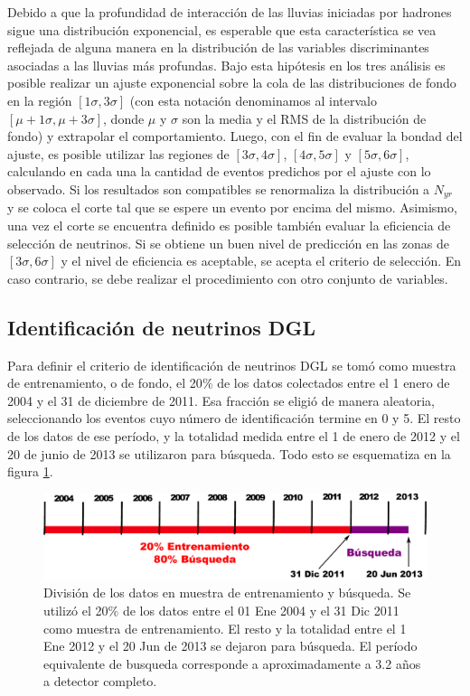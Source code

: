 	Debido a que la profundidad de interacción de las lluvias iniciadas por hadrones sigue una distribución exponencial, es esperable que esta característica se vea reflejada de alguna manera en la distribución de las variables discriminantes asociadas a las lluvias más profundas.
	Bajo esta hipótesis en los tres análisis es posible realizar un ajuste exponencial sobre la cola de las distribuciones de fondo en la región $[1\sigma, 3\sigma]$ (con esta notación denominamos al intervalo $[\mu+1\sigma, \mu+3\sigma]$, donde $\mu$ y $\sigma$ son la media y el RMS de la distribución de fondo) y extrapolar el comportamiento.
	Luego, con el fin de evaluar la bondad del ajuste, es posible utilizar las regiones de $[3\sigma, 4\sigma]$, $[4\sigma, 5\sigma]$ y $[5\sigma, 6\sigma]$, calculando en cada una la cantidad de eventos predichos por el ajuste con lo observado.
	Si los resultados son compatibles se renormaliza la distribución a $N_{yr}$ y se coloca el corte tal que se espere un evento por encima del mismo.
	Asimismo, una vez el corte se encuentra definido es posible también evaluar la eficiencia de selección de neutrinos.
	Si se obtiene un buen nivel de predicción en las zonas de $[3\sigma, 6\sigma]$ y el nivel de eficiencia es aceptable, se acepta el criterio de selección.
	En caso contrario, se debe realizar el procedimiento con otro conjunto de variables.
	
	\subsection{Identificación de neutrinos DGL}
	
	Para definir el criterio de identificación de neutrinos DGL se tomó como muestra de entrenamiento, o de fondo, el 20$\%$ de los datos colectados entre el 1 enero de 2004 y el 31 de diciembre de 2011.
	Esa fracción se eligió de manera aleatoria, seleccionando los eventos cuyo número de identificación termine en 0 y 5.
	El resto de los datos de ese período, y la totalidad medida entre el 1 de enero de 2012 y el 20 de junio de 2013 se utilizaron para búsqueda.
	Todo esto se esquematiza en la figura \ref{fig:periodosDGL}.
	\begin{figure}[ht]
	\begin{center}
	\includegraphics[width=\textwidth]{fig/seleccionAuger/periodosDGL}
	\caption{División de los datos en muestra de entrenamiento y búsqueda. Se utilizó el 20$\%$ de los datos entre el 01 Ene 2004 y el 31 Dic 2011 como muestra de entrenamiento. El resto y la totalidad entre el 1 Ene 2012 y el 20 Jun de 2013 se dejaron para búsqueda. El período equivalente de busqueda corresponde a aproximadamente a 3.2 años a detector completo.}
	\label{fig:periodosDGL}
	\end{center}
	\end{figure}
	

